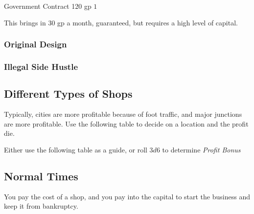 \documentclass[twocolumn]{dndbook}
\begin{document}
\begin{DndMonster}[width=.5\textwidth - 8pt]{Government Contract}
	\hfill 120 gp
	\hfill $1$
\end{DndMonster}

This brings in 30 gp a month, guaranteed, but requires a high level of capital.

\subsubsection{Original Design}


\subsubsection{Illegal Side Hustle}


\subsection{Different Types of Shops}








Typically, cities are more profitable because of foot traffic,
and major junctions are more profitable.
Use the following table to decide on a location and the profit die.



Either use the following table as a guide, or roll $3d6$ to determine \emph{Profit Bonus}

\subsection{Normal Times}
You pay the cost of a shop, and you pay into the capital to start the business and keep it from bankruptcy.
\end{document}
